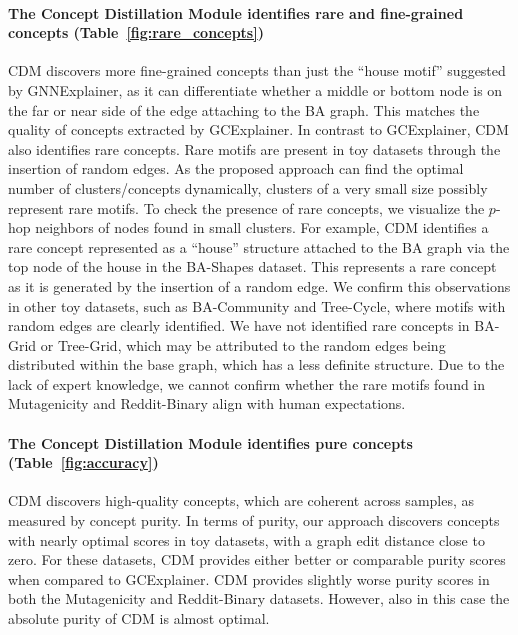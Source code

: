 \paragraph{The Concept Distillation Module identifies rare and fine-grained concepts (Table~\ref{fig:rare_concepts})}
CDM discovers more fine-grained concepts than just the ``house motif'' suggested by GNNExplainer, as it can differentiate whether a middle or bottom node is on the far or near side of the edge attaching to the BA graph. This matches the quality of concepts extracted by GCExplainer. In contrast to GCExplainer, CDM also identifies rare concepts. Rare motifs are present in toy datasets through the insertion of random edges. As the proposed approach can find the optimal number of clusters/concepts dynamically, clusters of a very small size possibly represent rare motifs. To check the presence of rare concepts, we visualize the $p$-hop neighbors of nodes found in small clusters. For example, CDM identifies a rare concept represented as a ``house'' structure attached to the BA graph via the top node of the house in the BA-Shapes dataset. This represents a rare concept as it is generated by the insertion of a random edge. We confirm this observations in other toy datasets, such as BA-Community and Tree-Cycle, where motifs with random edges are clearly identified. We have not identified rare concepts in BA-Grid or Tree-Grid, which may be attributed to the random edges being distributed within the base graph, which has a less definite structure. Due to the lack of expert knowledge, we cannot confirm whether the rare motifs found in Mutagenicity and Reddit-Binary align with human expectations.







\paragraph{The Concept Distillation Module identifies pure concepts (Table~\ref{fig:accuracy})}
CDM discovers high-quality concepts, which are coherent across samples, as measured by concept purity. In terms of purity, our approach discovers concepts with nearly optimal scores in toy datasets, with a graph edit distance close to zero. For these datasets, CDM provides either better or comparable purity scores when compared to GCExplainer. CDM provides slightly worse purity scores in both the Mutagenicity and Reddit-Binary datasets. However, also in this case the absolute purity of CDM is almost optimal.

